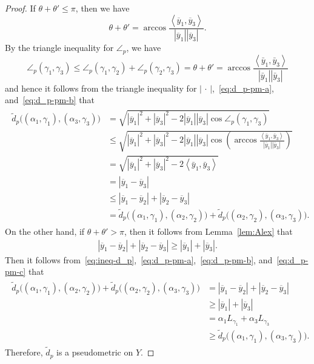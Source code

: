 \documentclass[draft]{amsart}
\numberwithin{equation}{section}
\newcommand{\ip}[2]{\left\langle #1, #2 \right\rangle}
\providecommand{\abs}[1]{\left\lvert#1\right\rvert}
\theoremstyle{plain}
\theoremstyle{definition}
\theoremstyle{remark}
\begin{document}
\begin{proof}
 If $\theta+\theta'\leq \pi$, then we have 
 \[
  \theta + \theta' 
  = \arccos \frac{\ip{\overline{y}_1}{\overline{y}_3}}
  {\abs{\overline{y}_1}\abs{\overline{y}_3}}.  
 \]
 By the triangle inequality for $\angle_p$, we have 
 \[
  \angle_p(\gamma_1, \gamma_3) 
  \leq \angle_p(\gamma_1, \gamma_2) +   \angle_p(\gamma_2, \gamma_3) 
  =\theta + \theta' =
  \arccos \frac{\ip{\bar{y}_1}{\bar{y}_3}}{\abs{\bar{y}_1}\abs{\bar{y}_3}}
 \]
 and hence it follows from 
 the triangle inequality 
 for $\abs{\,\cdot \,}$,~\eqref{eq:d_p-pm-a}, 
 and~\eqref{eq:d_p-pm-b} that 
 \begin{align*}
  \begin{split}
  \tilde{d}_p\bigl((\alpha_1, \gamma_1), (\alpha_3, \gamma_3)\bigr) 
  &=\sqrt{\abs{\overline{y}_1}^2 + \abs{\overline{y}_3}^2 
 -2\abs{\overline{y}_1}\abs{\overline{y}_3}\cos \angle_p(\gamma_1, \gamma_3)} \\
  &\leq \sqrt{\abs{\overline{y}_1}^2 + \abs{\overline{y}_3}^2 
 -2\abs{\overline{y}_1}\abs{\overline{y}_3}
 \cos \left(
 \arccos \frac{\ip{\bar{y}_1}{\bar{y}_3}}{\abs{\bar{y}_1}\abs{\bar{y}_3}}
 \right)
 } \\
  &= \sqrt{\abs{\overline{y}_1}^2 + \abs{\overline{y}_3}^2 
 -2\ip{\bar{y}_1}{\bar{y}_3}} \\
  &=\abs{\overline{y}_1-\overline{y}_3} \\
  &\leq \abs{\overline{y}_1-\overline{y}_2} + \abs{\overline{y}_2-\overline{y}_3} \\
  &= \tilde{d}_p\bigl((\alpha_1, \gamma_1), (\alpha_2, \gamma_2)\bigr) 
  + \tilde{d}_p\bigl((\alpha_2, \gamma_2), (\alpha_3, \gamma_3)\bigr). 
  \end{split}
 \end{align*}
On the other hand, if $\theta + \theta' > \pi$, 
 then it follows from Lemma~\ref{lem:Alex} that 
 \begin{align}\label{eq:d_p-pm-c}
  \abs{\overline{y}_1 - \overline{y}_2} + \abs{\overline{y}_2-\overline{y}_3} 
  \geq \abs{\overline{y}_1} + \abs{\overline{y}_3}. 
 \end{align}
 Then it 
 follows from~\eqref{eq:ineq-d_p},~\eqref{eq:d_p-pm-a},~\eqref{eq:d_p-pm-b}, and~\eqref{eq:d_p-pm-c} that 
 \begin{align*}
  \begin{split}
   \tilde{d}_p\bigl((\alpha_1, \gamma_1), (\alpha_2, \gamma_2)\bigr) 
  + \tilde{d}_p\bigl((\alpha_2, \gamma_2), (\alpha_3, \gamma_3)\bigr) 
  &= \abs{\overline{y}_1 - \overline{y}_2} + \abs{\overline{y}_2-\overline{y}_3} \\
  &\geq \abs{\overline{y}_1} + \abs{\overline{y}_3} \\
  &= \alpha_1 L_{\gamma_1} + \alpha_3 L_{\gamma_3} \\
  &\geq \tilde{d}_p\bigl((\alpha_1, \gamma_1), (\alpha_3, \gamma_3)\bigr). 
  \end{split}
 \end{align*}
 Therefore, $\tilde{d}_p$ is a pseudometric on $Y$. 
\end{proof}
\end{document}
